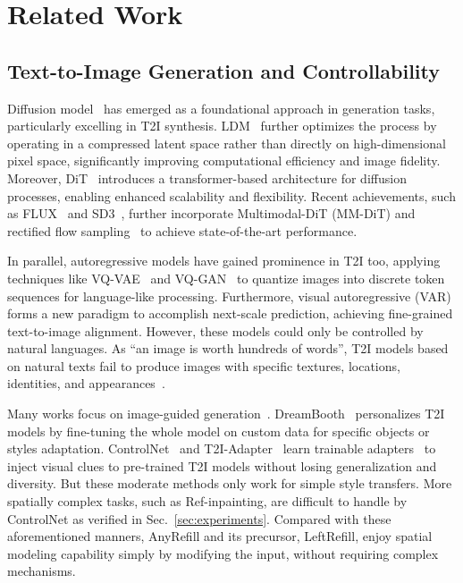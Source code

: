 \section{Related Work}
\subsection{Text-to-Image Generation and Controllability}
Diffusion model~\cite{sohl2015deep,ho2020denoising} has emerged as a foundational approach in generation tasks, particularly excelling in T2I synthesis. LDM~\cite{rombach2022high} further optimizes the process by operating in a compressed latent space rather than directly on high-dimensional pixel space, significantly improving computational efficiency and image fidelity. 
Moreover, DiT~\cite{peebles2023scalable} introduces a transformer-based architecture for diffusion processes, enabling enhanced scalability and flexibility. 
Recent achievements, such as FLUX~\cite{flux2024} and SD3~\cite{esser2024scaling}, further incorporate Multimodal-DiT (MM-DiT) and rectified flow sampling~\cite{liu2022flow} to achieve state-of-the-art performance. 

In parallel, autoregressive models have gained prominence in T2I too, applying techniques like VQ-VAE~\cite{van2017neural} and VQ-GAN~\cite{esser2021taming} to quantize images into discrete token sequences for language-like processing. 
Furthermore, visual autoregressive (VAR)~\cite{tian2024visual} forms a new paradigm to accomplish next-scale prediction, achieving fine-grained text-to-image alignment. 
However, these models could only be controlled by natural languages. As ``an image is worth hundreds of words'', T2I models based on natural texts fail to produce images with specific textures, locations, identities, and appearances~\cite{gal2022image}. 

Many works focus on image-guided generation~\cite{voynov2022sketch,li2023gligen,ma2023unified}. DreamBooth~\cite{ruiz2022dreambooth} personalizes T2I models by fine-tuning the whole model on custom data for specific objects or styles adaptation. ControlNet~\cite{zhang2023adding} and T2I-Adapter~\cite{mou2023t2i} learn trainable adapters~\cite{houlsby2019parameter} to inject visual clues to pre-trained T2I models without losing generalization and diversity.
But these moderate methods only work for simple style transfers. More spatially complex tasks, such as Ref-inpainting, are difficult to handle by ControlNet as verified in Sec.~\ref{sec:experiments}. 
Compared with these aforementioned manners, AnyRefill and its precursor, LeftRefill, enjoy spatial modeling capability simply by modifying the input, without requiring complex mechanisms.

